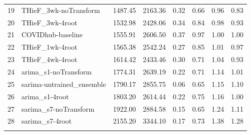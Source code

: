 \documentclass[12pt]{article}
\begin{document}
\begin{longtable}{llrrrrrr}
  19 & THieF\_3wk-noTransform & 1487.45 & 2163.36 & 0.32 & 0.66 & 0.96 & 0.83 \\ 
  20 & THieF\_3wk-4root & 1532.98 & 2428.06 & 0.34 & 0.84 & 0.98 & 0.93 \\ 
  21 & COVIDhub-baseline & 1555.91 & 2606.50 & 0.37 & 0.97 & 1.00 & 1.00 \\ 
  22 & THieF\_1wk-4root & 1565.38 & 2542.24 & 0.27 & 0.85 & 1.01 & 0.97 \\ 
  23 & THieF\_4wk-4root & 1614.42 & 2433.46 & 0.30 & 0.71 & 1.04 & 0.93 \\ 
  24 & arima\_s1-noTransform & 1774.31 & 2639.19 & 0.22 & 0.71 & 1.14 & 1.01 \\ 
  25 & sarima-untrained\_ensemble & 1790.17 & 2855.75 & 0.06 & 0.65 & 1.15 & 1.10 \\ 
  26 & arima\_s1-4root & 1803.20 & 2614.44 & 0.22 & 0.75 & 1.16 & 1.00 \\ 
  27 & sarima\_s7-noTransform & 1922.00 & 2884.58 & 0.15 & 0.65 & 1.24 & 1.11 \\ 
  28 & sarima\_s7-4root & 2155.20 & 3344.10 & 0.17 & 0.73 & 1.38 & 1.28 \\ 
   \hline
\hline
\label{tab:table_last17_us}
\end{longtable}
\endgroup
\newpage


\newpage
\end{document}
